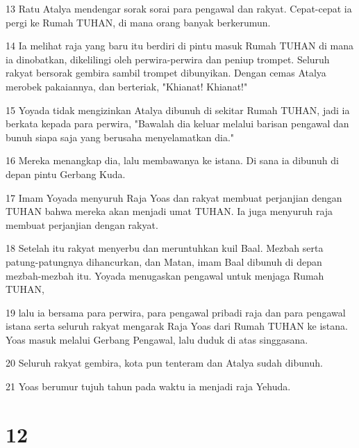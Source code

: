 \par 13 Ratu Atalya mendengar sorak sorai para pengawal dan rakyat. Cepat-cepat ia pergi ke Rumah TUHAN, di mana orang banyak berkerumun.
\par 14 Ia melihat raja yang baru itu berdiri di pintu masuk Rumah TUHAN di mana ia dinobatkan, dikelilingi oleh perwira-perwira dan peniup trompet. Seluruh rakyat bersorak gembira sambil trompet dibunyikan. Dengan cemas Atalya merobek pakaiannya, dan berteriak, "Khianat! Khianat!"
\par 15 Yoyada tidak mengizinkan Atalya dibunuh di sekitar Rumah TUHAN, jadi ia berkata kepada para perwira, "Bawalah dia keluar melalui barisan pengawal dan bunuh siapa saja yang berusaha menyelamatkan dia."
\par 16 Mereka menangkap dia, lalu membawanya ke istana. Di sana ia dibunuh di depan pintu Gerbang Kuda.
\par 17 Imam Yoyada menyuruh Raja Yoas dan rakyat membuat perjanjian dengan TUHAN bahwa mereka akan menjadi umat TUHAN. Ia juga menyuruh raja membuat perjanjian dengan rakyat.
\par 18 Setelah itu rakyat menyerbu dan meruntuhkan kuil Baal. Mezbah serta patung-patungnya dihancurkan, dan Matan, imam Baal dibunuh di depan mezbah-mezbah itu. Yoyada menugaskan pengawal untuk menjaga Rumah TUHAN,
\par 19 lalu ia bersama para perwira, para pengawal pribadi raja dan para pengawal istana serta seluruh rakyat mengarak Raja Yoas dari Rumah TUHAN ke istana. Yoas masuk melalui Gerbang Pengawal, lalu duduk di atas singgasana.
\par 20 Seluruh rakyat gembira, kota pun tenteram dan Atalya sudah dibunuh.
\par 21 Yoas berumur tujuh tahun pada waktu ia menjadi raja Yehuda.

\chapter{12}

